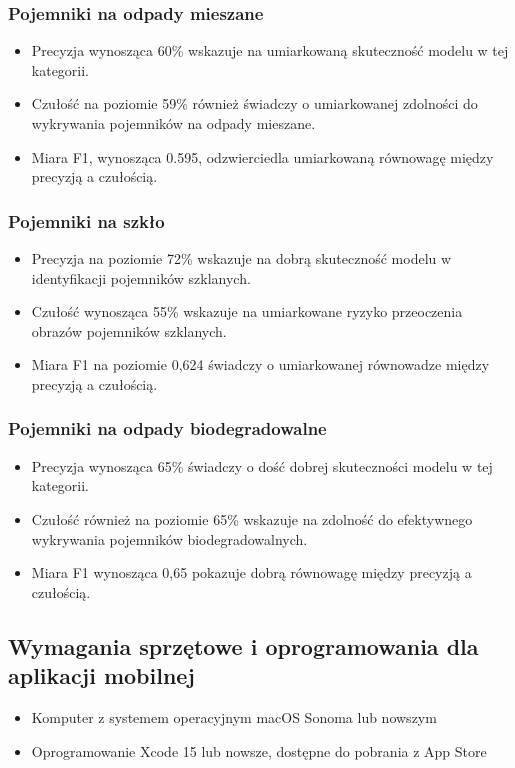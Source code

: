 \documentclass[12pt, a4paper, twoside, openany]{book}
\begin{document}
{\subsubsection{Pojemniki na odpady mieszane}
\begin{itemize}
    \item Precyzja wynosząca 60\% wskazuje na umiarkowaną skuteczność modelu w tej kategorii.
    \item Czułość na poziomie 59\% również świadczy o umiarkowanej zdolności do wykrywania pojemników na odpady mieszane.
    \item Miara F1, wynosząca 0.595, odzwierciedla umiarkowaną równowagę między precyzją a czułością.
\end{itemize}

\subsubsection{Pojemniki na szkło}
\begin{itemize}
    \item Precyzja na poziomie 72\% wskazuje na dobrą skuteczność modelu w identyfikacji pojemników szklanych.
    \item Czułość wynosząca 55\% wskazuje na umiarkowane ryzyko przeoczenia obrazów pojemników szklanych.
    \item Miara F1 na poziomie 0,624 świadczy o umiarkowanej równowadze między precyzją a czułością.
\end{itemize}

\subsubsection{Pojemniki na odpady biodegradowalne}
\begin{itemize}
    \item Precyzja wynosząca 65\% świadczy o dość dobrej skuteczności modelu w tej kategorii.
    \item Czułość również na poziomie 65\% wskazuje na zdolność do efektywnego wykrywania pojemników biodegradowalnych.
    \item Miara F1 wynosząca 0,65 pokazuje dobrą równowagę między precyzją a czułością.
\end{itemize}


\subsection{Wymagania sprzętowe i oprogramowania dla aplikacji mobilnej}
\begin{itemize}[label=--]
    \item Komputer z systemem operacyjnym macOS Sonoma lub nowszym
    \item Oprogramowanie Xcode 15 lub nowsze, dostępne do pobrania z App Store
\end{itemize}

}
\end{document}
